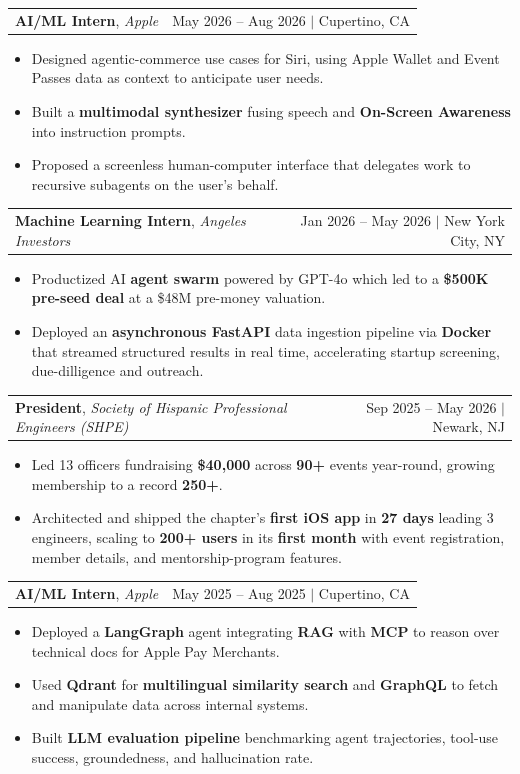 \documentclass[letterpaper,10pt]{article}
\makeatletter
\newcommand{\resumeItem}[1]{\item\small{{#1}}}
\newcommand{\resumeOneLineHeading}[4]{
  \vspace{1pt}\item
    \begin{tabular*}{0.97\textwidth}[t]{l@{\extracolsep{\fill}}r}
      \textbf{#1}, \textit{#2} & \small #3 $|$ #4 \\
    \end{tabular*}\vspace{-3pt}
}
\newcommand{\resumeItemListStart}{
  \begin{itemize}[leftmargin=0.25in]
}
\newcommand{\resumeItemListEnd}{
  \end{itemize}\vspace{-3pt}
}
\makeatother
\begin{document}
      
    \resumeOneLineHeading
      {AI/ML Intern}
      {Apple}
      {May 2026 -- Aug 2026}
      {Cupertino, CA}

      \vspace{5pt}

      \resumeItemListStart
      \resumeItem{Designed agentic-commerce use cases for Siri, using Apple Wallet and Event Passes data as context to anticipate user needs.}
      \resumeItem{Built a \textbf{multimodal synthesizer} fusing speech and \textbf{On-Screen Awareness} into instruction prompts.}
      \resumeItem{Proposed a screenless human-computer interface that delegates work to recursive subagents on the user's behalf.}
      \resumeItemListEnd


    \resumeOneLineHeading
      {Machine Learning Intern}
      {Angeles Investors}
      {Jan 2026 -- May 2026}
      {New York City, NY}

      \vspace{5pt}


      \resumeItemListStart
        \resumeItem{Productized AI \textbf{agent swarm} powered by GPT-4o which led to a \textbf{\$500K pre-seed deal} at a \$48M pre-money valuation.}
        \resumeItem{Deployed an \textbf{asynchronous FastAPI} data ingestion pipeline via \textbf{Docker} that streamed structured results in real time, accelerating startup screening, due-dilligence and outreach.}
      \resumeItemListEnd
  



    \resumeOneLineHeading
      {President}
      {Society of Hispanic Professional Engineers (SHPE)}
      {Sep 2025 -- May 2026 }
      {Newark, NJ}

      \vspace{5pt}

      \resumeItemListStart
        \resumeItem{Led 13 officers fundraising \textbf{\$40,000} across \textbf{90+} events year-round, growing membership to a record \textbf{250+}.}
        \resumeItem{Architected and shipped the chapter's \textbf{first iOS app} in \textbf{27 days} leading 3 engineers, scaling to \textbf{200+ users} in its \textbf{first month} with event registration, member details, and mentorship-program features.}
      \resumeItemListEnd

    \resumeOneLineHeading
      {AI/ML Intern}
      {Apple}
      {May 2025 -- Aug 2025}
      {Cupertino, CA}

      \vspace{5pt}

      \resumeItemListStart
        \resumeItem{Deployed a \textbf{LangGraph} agent integrating \textbf{RAG} with \textbf{MCP} to reason over technical docs for Apple Pay Merchants.}
        \resumeItem{Used \textbf{Qdrant} for \textbf{multilingual similarity search} and \textbf{GraphQL} to fetch and manipulate data across internal systems.}
        \resumeItem{Built \textbf{LLM evaluation pipeline} benchmarking agent trajectories, tool-use success, groundedness, and hallucination rate.}
      \resumeItemListEnd
\end{document}
